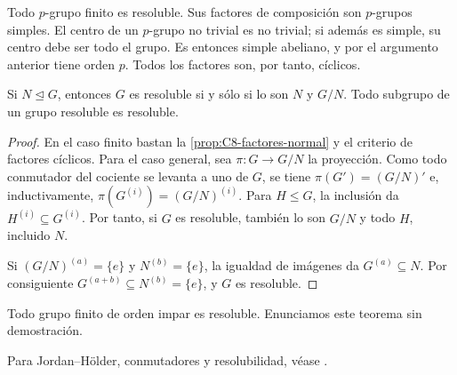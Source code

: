 \begin{ejem}
Todo $p$-grupo finito es resoluble. Sus factores de composición son $p$-grupos simples. El centro de un $p$-grupo no trivial es no trivial; si además es simple, su centro debe ser todo el grupo. Es entonces simple abeliano, y por el argumento anterior tiene orden $p$. Todos los factores son, por tanto, cíclicos.
\end{ejem}

\begin{samepage}
\begin{coro}\label{coro:C8-extension-resoluble}
Si $N\trianglelefteq G$, entonces $G$ es resoluble si y sólo si lo son $N$ y $G/N$. Todo subgrupo de un grupo resoluble es resoluble.
\end{coro}
\begin{proof}
En el caso finito bastan la \cref{prop:C8-factores-normal} y el criterio de factores cíclicos. Para el caso general, sea $\pi:G\to G/N$ la proyección. Como todo conmutador del cociente se levanta a uno de $G$, se tiene $\pi(G')=(G/N)'$ e, inductivamente, $\pi(G^{(i)})=(G/N)^{(i)}$. Para $H\le G$, la inclusión da $H^{(i)}\subseteq G^{(i)}$. Por tanto, si $G$ es resoluble, también lo son $G/N$ y todo $H$, incluido $N$.

Si $(G/N)^{(a)}=\{e\}$ y $N^{(b)}=\{e\}$, la igualdad de imágenes da $G^{(a)}\subseteq N$. Por consiguiente $G^{(a+b)}\subseteq N^{(b)}=\{e\}$, y $G$ es resoluble.
\end{proof}
\begin{obs}
Todo grupo finito de orden impar es resoluble. Enunciamos este teorema sin demostración.
\end{obs}

\begin{obs}
Para Jordan--Hölder, conmutadores y resolubilidad, véase \citet[cap.~IV, 3.1--13]{aluffi2009}.
\end{obs}
\end{samepage}
